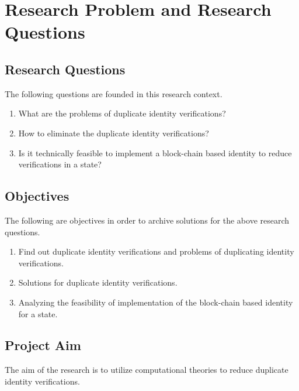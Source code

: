 \section{Research Problem and Research Questions}

\subsection{Research Questions}
The following questions are founded in this research context. 
\begin{enumerate}
    \item What are the problems of duplicate identity verifications?
    \item How to eliminate the duplicate identity verifications?
    \item Is it technically feasible to implement a block-chain based identity to reduce verifications in a state?
\end{enumerate}

\subsection{Objectives}
The following are objectives in order to archive solutions for the above research questions.
\begin{enumerate}
    \item Find out duplicate identity verifications and problems of duplicating identity verifications.
    \item Solutions for duplicate identity verifications.
    \item Analyzing the feasibility of implementation of the block-chain based identity for a state.
\end{enumerate}

\subsection{Project Aim}
The aim of the research is to utilize computational theories to reduce duplicate identity verifications.

